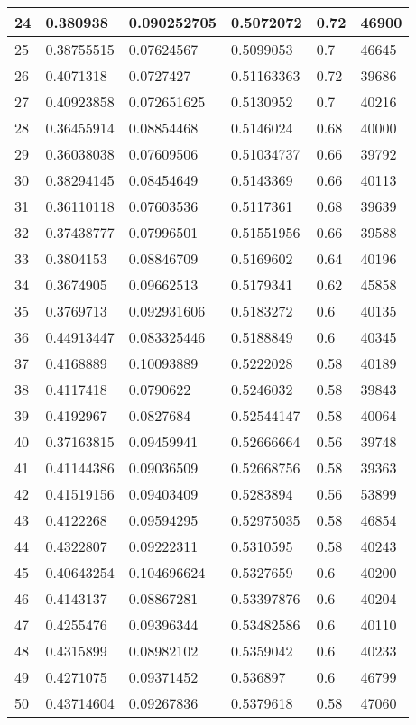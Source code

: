 \begin{longtable}{|l|l|l|l|l|l|}
24 & 0.380938 & 0.090252705 & 0.5072072 & 0.72 & 46900 \\ \hline 
25 & 0.38755515 & 0.07624567 & 0.5099053 & 0.7 & 46645 \\ \hline 
26 & 0.4071318 & 0.0727427 & 0.51163363 & 0.72 & 39686 \\ \hline 
27 & 0.40923858 & 0.072651625 & 0.5130952 & 0.7 & 40216 \\ \hline 
28 & 0.36455914 & 0.08854468 & 0.5146024 & 0.68 & 40000 \\ \hline 
29 & 0.36038038 & 0.07609506 & 0.51034737 & 0.66 & 39792 \\ \hline 
30 & 0.38294145 & 0.08454649 & 0.5143369 & 0.66 & 40113 \\ \hline 
31 & 0.36110118 & 0.07603536 & 0.5117361 & 0.68 & 39639 \\ \hline 
32 & 0.37438777 & 0.07996501 & 0.51551956 & 0.66 & 39588 \\ \hline 
33 & 0.3804153 & 0.08846709 & 0.5169602 & 0.64 & 40196 \\ \hline 
34 & 0.3674905 & 0.09662513 & 0.5179341 & 0.62 & 45858 \\ \hline 
35 & 0.3769713 & 0.092931606 & 0.5183272 & 0.6 & 40135 \\ \hline 
36 & 0.44913447 & 0.083325446 & 0.5188849 & 0.6 & 40345 \\ \hline 
37 & 0.4168889 & 0.10093889 & 0.5222028 & 0.58 & 40189 \\ \hline 
38 & 0.4117418 & 0.0790622 & 0.5246032 & 0.58 & 39843 \\ \hline 
39 & 0.4192967 & 0.0827684 & 0.52544147 & 0.58 & 40064 \\ \hline 
40 & 0.37163815 & 0.09459941 & 0.52666664 & 0.56 & 39748 \\ \hline 
41 & 0.41144386 & 0.09036509 & 0.52668756 & 0.58 & 39363 \\ \hline 
42 & 0.41519156 & 0.09403409 & 0.5283894 & 0.56 & 53899 \\ \hline 
43 & 0.4122268 & 0.09594295 & 0.52975035 & 0.58 & 46854 \\ \hline 
44 & 0.4322807 & 0.09222311 & 0.5310595 & 0.58 & 40243 \\ \hline 
45 & 0.40643254 & 0.104696624 & 0.5327659 & 0.6 & 40200 \\ \hline 
46 & 0.4143137 & 0.08867281 & 0.53397876 & 0.6 & 40204 \\ \hline 
47 & 0.4255476 & 0.09396344 & 0.53482586 & 0.6 & 40110 \\ \hline 
48 & 0.4315899 & 0.08982102 & 0.5359042 & 0.6 & 40233 \\ \hline 
49 & 0.4271075 & 0.09371452 & 0.536897 & 0.6 & 46799 \\ \hline 
50 & 0.43714604 & 0.09267836 & 0.5379618 & 0.58 & 47060 \\ \hline 
\end{longtable}